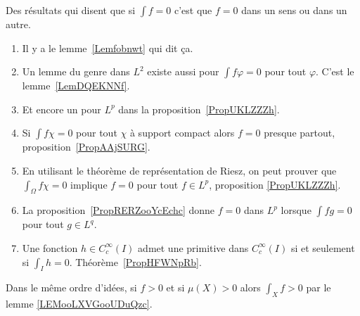 Des résultats qui disent que si \( \int f=0\) c'est que \( f=0\) dans un sens ou dans un autre.
\begin{enumerate}
	\item
	      Il y a le lemme~\ref{Lemfobnwt} qui dit ça.
	\item
	      Un lemme du genre dans \( L^2\) existe aussi pour \( \int f\varphi=0\) pour tout \( \varphi\). C'est le lemme~\ref{LemDQEKNNf}.
	\item
	      Et encore un pour \( L^p\) dans la proposition~\ref{PropUKLZZZh}.
	\item
	      Si \( \int f\chi=0\) pour tout \( \chi\) à support compact alors \( f=0\) presque partout, proposition~\ref{PropAAjSURG}.
	\item
	      En utilisant le théorème de représentation de Riesz, on peut prouver que \( \int_{\Omega}f\chi=0\) implique \( f=0\) pour tout \( f\in L^p\), proposition \ref{PropUKLZZZh}.
	\item
	      La proposition~\ref{PropRERZooYcEchc} donne \( f=0\) dans \( L^p\) lorsque \( \int fg=0\) pour tout \( g\in L^q\).
	\item
	      Une fonction \( h\in C^{\infty}_c(I)\) admet une primitive dans \(  C^{\infty}_c(I)\) si et seulement si \( \int_Ih=0\). Théorème~\ref{PropHFWNpRb}.
\end{enumerate}

Dans le même ordre d'idées, si \( f>0\) et si \( \mu(X)>0\) alors \( \int_Xf>0\) par le lemme \ref{LEMooLXVGooUDuQzc}.
